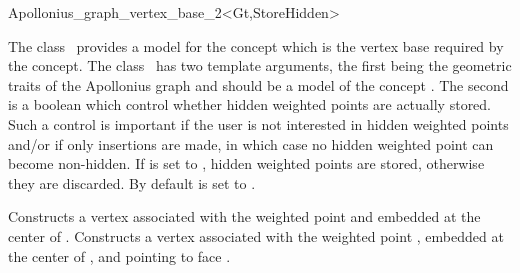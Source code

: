 
\begin{ccRefClass}{Apollonius_graph_vertex_base_2<Gt,StoreHidden>}


\ccDefinition

The class \ccRefName\ provides a model for the
 concept which is the vertex base
required by the  concept. The
class \ccRefName\ has two template arguments, the first being the
geometric traits of the Apollonius graph and should be a model of the
concept . The second is a boolean which
control whether hidden weighted points are actually stored. Such a
control is important if the user is not interested in hidden weighted
points and/or if only insertions are made, in which case no hidden
weighted point can become non-hidden. If  is set to
, hidden weighted points are stored, otherwise they are
discarded. By default  is set to .


\ccIsModel
{}

\ccCreation
{}  %

\ccGlue
{}
{Constructs a vertex associated with the weighted point  and
embedded at the center of .}
\ccGlue
{}
{Constructs a vertex associated with
the weighted point , embedded at the center of ,
and pointing to face .}



\ccSeeAlso
{}\\
\\

\end{ccRefClass}


